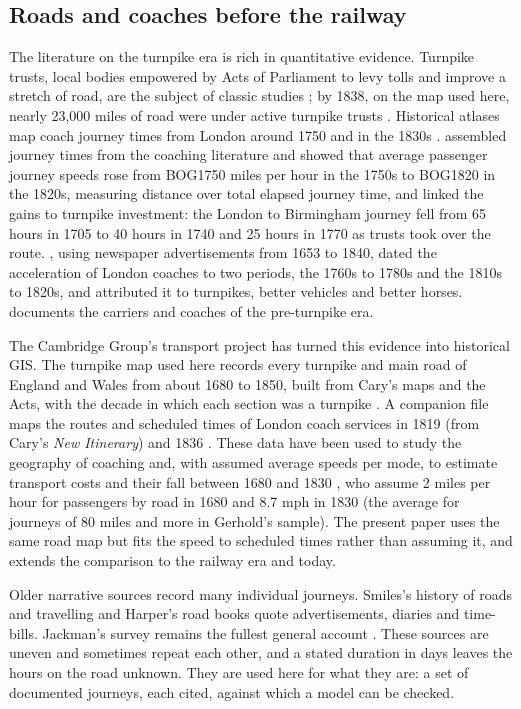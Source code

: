 \subsection{Roads and coaches before the railway}
The literature on the turnpike era is rich in quantitative evidence. Turnpike trusts, local bodies empowered by Acts of Parliament to levy tolls and improve a stretch of road, are the subject of classic studies \citep{albert1972,pawson1977}; by 1838, on the map used here, nearly 23,000 miles of road were under active turnpike trusts \citep{rosevear2023tp}. Historical atlases map coach journey times from London around 1750 and in the 1830s \citep{pope1989}. \citet{bogart2005} assembled journey times from the coaching literature and showed that average passenger journey speeds rose from {{BOG1750}} miles per hour in the 1750s to {{BOG1820}} in the 1820s, measuring distance over total elapsed journey time, and linked the gains to turnpike investment: the London to Birmingham journey fell from 65 hours in 1705 to 40 hours in 1740 and 25 hours in 1770 as trusts took over the route. \citet{gerhold2014}, using newspaper advertisements from 1653 to 1840, dated the acceleration of London coaches to two periods, the 1760s to 1780s and the 1810s to 1820s, and attributed it to turnpikes, better vehicles and better horses. \citet{gerhold2005} documents the carriers and coaches of the pre-turnpike era.

The Cambridge Group's transport project has turned this evidence into historical GIS. The turnpike map used here records every turnpike and main road of England and Wales from about 1680 to 1850, built from Cary's maps and the Acts, with the decade in which each section was a turnpike \citep{rosevear2023tp}. A companion file maps the routes and scheduled times of London coach services in 1819 (from Cary's \textit{New Itinerary}) and 1836 \citep{bates1969,rosevear2023coach}. These data have been used to study the geography of coaching \citep{rosevear2018} and, with assumed average speeds per mode, to estimate transport costs and their fall between 1680 and 1830 \citep{alvarez2017}, who assume 2 miles per hour for passengers by road in 1680 and 8.7 mph in 1830 (the average for journeys of 80 miles and more in Gerhold's sample). The present paper uses the same road map but fits the speed to scheduled times rather than assuming it, and extends the comparison to the railway era and today.

Older narrative sources record many individual journeys. Smiles's history of roads and travelling \citep{smiles1867} and Harper's road books \citep{harper1899,harper1902,harper1903,harper1922} quote advertisements, diaries and time-bills. Jackman's survey remains the fullest general account \citep{jackman1916}. These sources are uneven and sometimes repeat each other, and a stated duration in days leaves the hours on the road unknown. They are used here for what they are: a set of documented journeys, each cited, against which a model can be checked.

